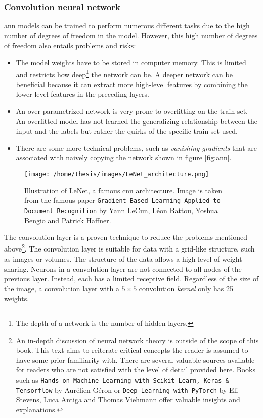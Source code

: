 \subsubsection{Convolution neural network}

\acrshort{ann} models can be trained to perform numerous different tasks due to the high number of degrees of freedom in the model.
However, this high number of degrees of freedom also entails problems and risks:

\begin{itemize}
    \item The model weights have to be stored in computer memory. 
    This is limited and restricts how deep\footnote{The depth of a network is the number of hidden layers.} the network can be.
    A deeper network can be beneficial because it can extract more high-level features by combining the lower level features in the preceding layers. 
    \item An over-parametrized network is very prone to overfitting on the train set. 
    An overfitted model has not learned the generalizing relationship between the input and the labels but rather the quirks of the specific train set used.
    \item There are some more technical problems, such as \textit{vanishing gradients} that are associated with naively copying the network shown in figure \ref{fig:ann}. 
\end{itemize}
\begin{SCfigure}[][h!]
    \centering
    \texttt{[image: /home/thesis/images/LeNet\_architecture.png]}
    \caption{
        Illustration of LeNet, a famous \Gls{cnn} architecture.
        Image is taken from the famous paper \texttt{Gradient-Based Learning Applied to Document Recognition} by Yann LeCun, Léon Battou, Yoshua Bengio and Patrick Haffner. \label{fig:LeNet}
        }
\end{SCfigure}
\par{
    The convolution layer is a proven technique to reduce the problems mentioned above\footnote{
        An in-depth discussion of neural network theory is outside of the scope of this book.
        This text aims to reiterate critical concepts the reader is assumed to have some prior familiarity with.
        There are several valuable sources available for readers who are not satisfied with the level of detail provided here.
        Books such as \texttt{Hands-on Machine Learning with Scikit-Learn, Keras \& Tensorflow} by Aurélien Géron or \texttt{Deep Learning with PyTorch} by Eli Stevens, Luca Antiga and Thomas Viehmann offer valuable insights and explanations.
    }.
    The convolution layer is suitable for data with a grid-like structure, such as images or volumes.
    The structure of the data allows a high level of weight-sharing. 
    Neurons in a convolution layer are not connected to all nodes of the previous layer. Instead, each has a limited receptive field.
    Regardless of the size of the image, a convolution layer with a $5\times 5$ convolution \textit{kernel} only has 25 weights.
}
